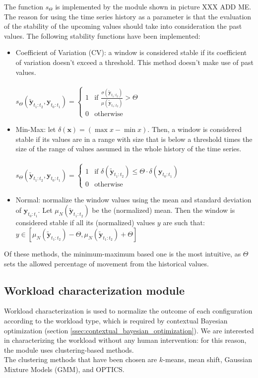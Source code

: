 \documentclass[a4paper]{article} %
\begin{document}
	The function $s_\Theta$ is implemented by the module shown in picture XXX ADD ME.
	The reason for using the time series history as a parameter is that the evaluation of the stability of the upcoming values should take into consideration the past values. The following stability functions have been implemented:
	\begin{itemize}
		\item Coefficient of Variation (CV): a window is considered stable if its coefficient of variation doesn't exceed a threshold. This method doesn't make use of past values.\\\\
		$
		s_\Theta(\tilde{\pmb{y}}_{t_1:t_2}, \pmb{y}_{t_0:t_1}) = \begin{cases}
			1 & \text{if } \frac{\sigma (\tilde{\pmb{y}}_{t_1:t_2})}{\mu (\tilde{\pmb{y}}_{t_1:t_2})} > \Theta\\
			0 & \text{otherwise}
		\end{cases}    
		$
		\item Min-Max: let $\delta (\pmb{x}) = (\max{x} - \min{x})$. Then, a window is considered stable if its values are in a range with size that is below a threshold times the size of the range of values assumed in the whole history of the time series.\\\\
		$
		s_\Theta(\tilde{\pmb{y}}_{t_1:t_2}, \pmb{y}_{t_0:t_1}) = \begin{cases}
			1 & \text{if } \delta (\tilde{\pmb{y}}_{t_1:t_2}) \leq \Theta \cdot \delta (\pmb{y}_{t_0:t_1}) \\
			0 & \text{otherwise}
		\end{cases}    
		$
		\item Normal: normalize the window values using the mean and standard deviation of $\pmb{y}_{t_0:t_1}$. Let $\mu_N (\tilde{\pmb{y}}_{t_1:t_2})$ be the (normalized) mean. Then the window is considered stable if all its (normalized) values $y$ are such that: $y \in [\mu_N (\tilde{\pmb{y}}_{t_1:t_2}) - \Theta, \mu_N (\tilde{\pmb{y}}_{t_1:t_2}) + \Theta]$
	\end{itemize}
	Of these methods, the minimum-maximum based one is the most intuitive, as $\Theta$ sets the allowed percentage of movement from the historical values.
	
	\subsection{Workload characterization module}  \label{ssec:workload_characterization_module}
	Workload characterization is used to normalize the outcome of each configuration according to the workload type, which is required by contextual Bayesian optimization (section \ref{ssec:contextual_bayesian_optimization}). We are interested in characterizing the workload without any human intervention: for this reason, the module uses clustering-based methods. \\
	The clustering methods that have been chosen are $k$-means, mean shift, Gaussian Mixture Models (GMM), and OPTICS.
	
\end{document}
